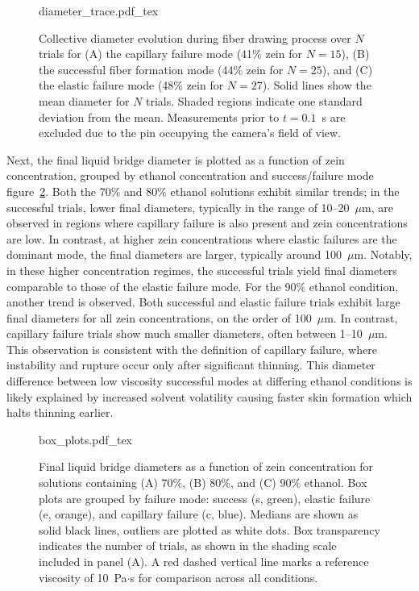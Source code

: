 \documentclass[lineno]{JFM-FLM_Au}
\begin{document}
\begin{figure}[tbp]
    \centering
    \def\svgwidth{0.7\textwidth} %
    {diameter_trace.pdf_tex}
	\caption{
		Collective diameter evolution during fiber drawing process over $N$ trials for
		(A) the capillary failure mode (41\% zein for $N=15$),
		(B) the successful fiber formation mode (44\% zein for $N=25$), and
		(C) the elastic failure mode (48\% zein for $N=27$).
		Solid lines show the mean diameter for $N$ trials. 
		Shaded regions indicate one standard deviation from the mean.
		Measurements prior to $t=0.1$~s are excluded due to the pin occupying the camera's field of view.
	}
	\label{fig:diameter_trace}
\end{figure}


Next, the final liquid bridge diameter is plotted as a function of zein concentration, grouped by ethanol concentration and success/failure mode figure~\ref{fig:diameter_by_etoh}. 
Both the 70\% and 80\% ethanol solutions exhibit similar trends; in the successful trials, lower final diameters, typically in the range of 10--20~$\mu$m, are observed in regions where capillary failure is also present and zein concentrations are low. In contrast, at higher zein concentrations where elastic failures are the dominant mode, the final diameters are larger, typically around 100~$\mu$m. Notably, in these higher concentration regimes, the successful trials yield final diameters comparable to those of the elastic failure mode. 
For the 90\% ethanol condition, another trend is observed. Both successful and elastic failure trials exhibit large final diameters for all zein concentrations, on the order of 100~$\mu$m. In contrast, capillary failure trials show much smaller diameters, often between 1--10~$\mu$m. This observation is consistent with the definition of capillary failure, where instability and rupture occur only after significant thinning. This diameter difference between low viscosity successful modes at differing ethanol conditions is likely explained by increased solvent volatility causing faster skin formation which halts thinning earlier. 


\begin{figure}[tbp]
    \centering
    \def\svgwidth{0.7\textwidth} %
    {box_plots.pdf_tex}
	\caption{
		Final liquid bridge diameters as a function of zein concentration for solutions containing (A) 70\%, (B) 80\%, and (C) 90\% ethanol.
		Box plots are grouped by failure mode: success (s, green), elastic failure (e, orange), and capillary failure (c, blue). 
		Medians are shown as solid black lines, outliers are plotted as white dots.
		Box transparency indicates the number of trials, as shown in the shading scale included in panel (A).
		A red dashed vertical line marks a reference viscosity of 10~Pa$\cdot$s for comparison across all conditions.
	}
    \label{fig:diameter_by_etoh}
\end{figure}
\end{document}
